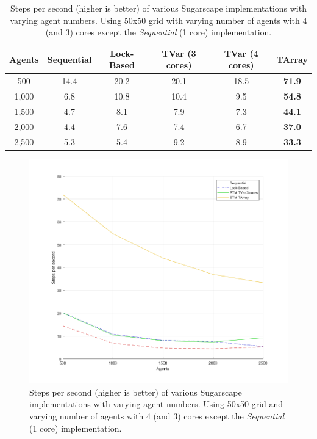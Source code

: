 \begin{table}
	\centering
  	\begin{tabular}{ c || c | c | c | c | c }
        Agents  & Sequential & Lock-Based & TVar (3 cores) & TVar (4 cores) & TArray  \\ \hline \hline 
    	    500     & 14.4       & 20.2		  &	20.1           & 18.5       	& \textbf{71.9}    \\ \hline
   		1,000   & 6.8        & 10.8 	      & 10.4           & 9.5         & \textbf{54.8}    \\ \hline
   		1,500   & 4.7        & 8.1 		  & 7.9            & 7.3			& \textbf{44.1}    \\ \hline
   		2,000   & 4.4        & 7.6 		  & 7.4            & 6.7    		& \textbf{37.0}    \\ \hline 
   		2,500   & 5.3        & 5.4 		  & 9.2            & 8.9			& \textbf{33.3}    \\ \hline \hline
   	\end{tabular}
  	
  	\caption[Steps per second of various Sugarscape implementations with varying agent numbers]{Steps per second (higher is better) of various Sugarscape implementations with varying agent numbers. Using 50x50 grid with varying number of agents with 4 (and 3) cores except the \textit{Sequential} (1 core) implementation.}
	\label{tab:state_results_agentsscale_time}
\end{table}

\begin{figure}
	\centering
	\includegraphics[width=1.0\textwidth, angle=0]{./fig/concurrentabs/sugarscape/varying_agents.png}
	\caption[Steps per second of various Sugarscape implementations with varying agent numbers]{Steps per second (higher is better) of various Sugarscape implementations with varying agent numbers. Using 50x50 grid and varying number of agents with 4 (and 3) cores except the \textit{Sequential} (1 core) implementation.}
	\label{fig:state_results_agentsscale_time}
\end{figure}

